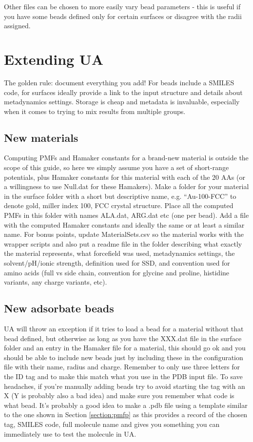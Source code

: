 \documentclass[10pt,a4paper,onecolumn]{report}
\begin{document}
 Other files can be chosen to more easily vary bead parameters - this is useful if you have some beads defined only for certain surfaces or disagree with the radii assigned.


\section{Extending UA}
The golden rule: document everything you add! For beads include a SMILES code, for surfaces ideally provide a link to the input structure and details about metadynamics settings. Storage is cheap and metadata is invaluable, especially when it comes to trying to mix results from multiple groups.

\subsection{New materials}
Computing PMFs and Hamaker constants for a brand-new material is outside the scope of this guide, so here we simply assume you have a set of short-range potentials, plus Hamaker constants for this material with each of the 20 AAs (or a willingness to use Null.dat for these Hamakers). Make a folder for your material in the surface folder with a short but descriptive name, e.g. ``Au-100-FCC'' to denote gold, miller index 100, FCC crystal structure. Place all the computed PMFs in this folder with names ALA.dat, ARG.dat etc (one per bead). Add a file with the computed Hamaker constants and ideally the same or at least a similar name. For bonus points, update MaterialSets.csv so the material works with the wrapper scripts and also put a readme file in the folder describing what exactly the material represents, what forcefield was used, metadynamics settings, the solvent/pH/ionic strength, definition used for SSD, and convention used for amino acids (full vs side chain, convention for glycine and proline, histidine variants, any charge variants, etc). 

\subsection{New adsorbate beads}
UA will throw an exception if it tries to load a bead for a material without that bead defined, but otherwise as long as you have the XXX.dat file in the surface folder and an entry in the Hamaker file for a material, this should go ok and you should be able to include new beads just by including these in the configuration file with their name, radius and charge. Remember to only use three letters for the ID tag and to make this match what you use in the PDB input file. To save headaches, if you're manually adding beads try to avoid starting the tag with an X (Y is probably also a bad idea) and make sure you remember what code is what bead. It's probably a good idea to make a .pdb file using a template similar to the one shown in Section \ref{section:pmfp} as this provides a record of the chosen tag, SMILES code, full molecule name and gives you something you can immediately use to test the molecule in UA. 
\end{document}
